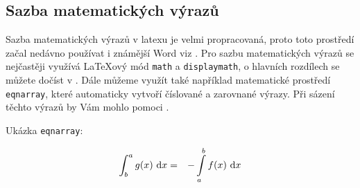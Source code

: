 \documentclass[a4paper,12pt]{article}
\begin{document}
\subsection{Sazba matematických výrazů}
Sazba matematických výrazů v latexu je velmi propracovaná, proto toto prostředí začal nedávno používat i známější Word viz \cite{Matthews}. Pro sazbu matematických výrazů se nejčastěji využívá \LaTeX ový mód \texttt{math} a \texttt{displaymath}, o hlavních rozdílech se můžete dočíst v \cite{Olsak}.
Dále můžeme využít také například matematické prostředí \texttt{eqnarray}, které automaticky vytvoří číslované a zarovnané výrazy. Při sázení těchto výrazů by Vám mohlo pomoci \cite{Gratzer}.

Ukázka \texttt{eqnarray}:

\begin{eqnarray}
    \int_b^a g(x)~\textnormal{d}x & = & - \int\limits_a^b f(x)~\textnormal{d}x
\end{eqnarray}

\newpage
\renewcommand{\refname}{Použité zdroje}


\end{document}
